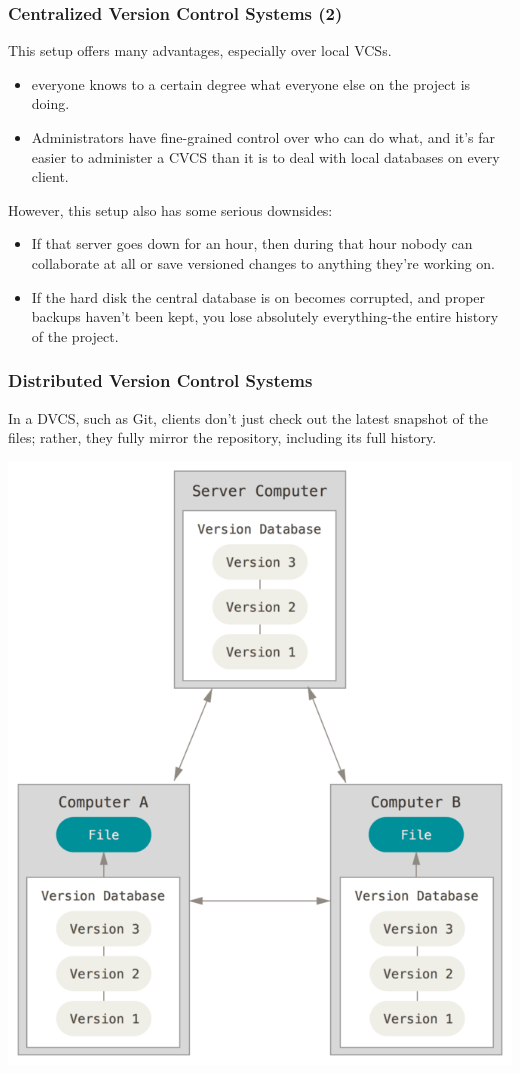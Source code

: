 \begin{frame}
  \frametitle{Centralized Version Control Systems (2)}
  This setup offers many advantages, especially over local VCSs.
  \begin{itemize}
   \item everyone knows to a certain degree what everyone else on the project is doing.
   \item Administrators have fine-grained control over who can do what, and it's far easier to administer a CVCS than it is to deal with local databases on every client. 
  \end{itemize}
  However, this setup also has some serious downsides:
  \begin{itemize}
   \item If that server goes down for an hour, then during that hour nobody can collaborate at all or save versioned changes to anything they're working on.
   \item If the hard disk the central database is on becomes corrupted, and proper backups haven't been kept, you lose absolutely everything-the entire history of the project.
  \end{itemize}
\end{frame}

\begin{frame}
  \frametitle{Distributed Version Control Systems}
  In a DVCS, such as Git, clients don’t just check out the latest snapshot of the files; rather, they fully mirror the repository, including its full history.
    \vspace{1em}
  \begin{center}
    \includegraphics[width=0.5\linewidth]{figures/distributed}
  \end{center}
\end{frame}

